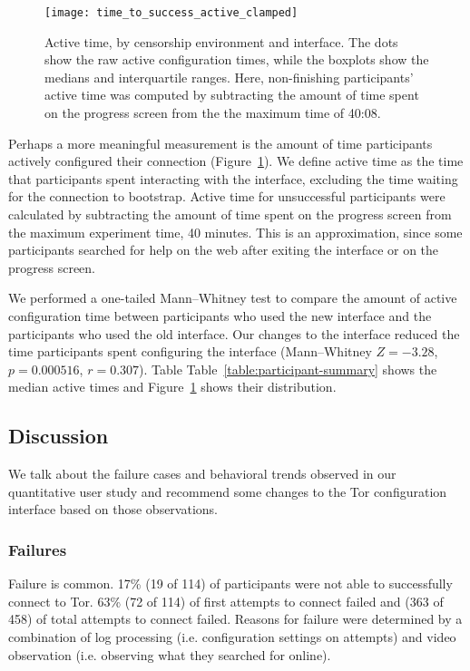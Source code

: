 \documentclass[USenglish,oneside,twocolumn]{article}
\begin{document}
\begin{figure}[t]
\centering
\texttt{[image: time\_to\_success\_active\_clamped]}
\caption{
Active time, by censorship environment and interface.
The dots show the raw active configuration times,
while the boxplots show the medians and interquartile ranges.
Here, non-finishing participants' active time was computed by
subtracting the amount of time spent on the progress screen from the 
the maximum time of 40:08.
}
\label{fig:time_to_success_active_clamped}
\end{figure}

Perhaps a more meaningful measurement is the amount of time participants actively configured their connection (Figure~\ref{fig:time_to_success_active_clamped}). We define active time as the time that participants spent interacting with the interface, excluding the time waiting for the connection to bootstrap. Active time for unsuccessful participants were calculated by subtracting the amount of time spent on the progress screen from the maximum experiment time, 40 minutes. This is an approximation, since some participants searched for help on the web after exiting the interface or on the progress screen. 

We performed a one-tailed Mann--Whitney test to compare the amount of active configuration time between participants who used the new interface and the participants who used the old interface. Our changes to the interface reduced the time participants spent configuring the interface (Mann--Whitney $Z = -3.28$, $p = 0.000516$, $r = 0.307$). Table Table~\ref{table:participant-summary} shows the median active times and Figure~\ref{fig:time_to_success_active_clamped} shows their distribution.


\subsection{Discussion} 
We talk about the failure cases and behavioral trends observed in our quantitative user study and recommend some changes to the Tor configuration interface based on those observations. 

\subsubsection{Failures}
Failure is common. 17\% (19 of 114) of participants were not able to successfully connect to Tor. 63\% (72 of 114) of first attempts to connect failed and (363 of 458) of total attempts to connect failed. Reasons for failure were determined by a combination of log processing (i.e. configuration settings on attempts) and video observation (i.e. observing what they searched for online). \\ 
\end{document}
